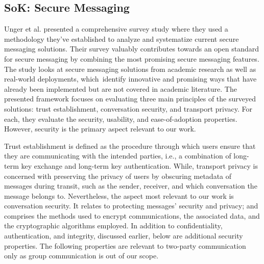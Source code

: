 \subsection{SoK: Secure Messaging}
Unger et al. \cite{unger2015sok} presented a comprehensive survey study where they used a methodology they've established to analyze and systematize current secure messaging solutions. Their survey valuably contributes towards an open standard for secure messaging by combining the most promising secure messaging features. The study looks at secure messaging solutions from academic research as well as real-world deployments, which identify innovative and promising ways that have already been implemented but are not covered in academic literature. The presented framework focuses on evaluating three main principles of the surveyed solutions: trust establishment, conversation security, and transport privacy.
For each, they evaluate the security, usability, and ease-of-adoption properties. However, security is the primary aspect relevant to our work.
\par
Trust establishment is defined as the procedure through which users ensure that they are communicating with the intended parties, i.e., a combination of long-term key exchange and long-term key authentication. While, transport privacy is concerned with preserving the privacy of users by obscuring metadata of messages during transit, such as the sender, receiver, and which conversation the message belongs to. Nevertheless, the aspect most relevant to our work is conversation security. It relates to protecting messages' security and privacy; and comprises the methods used to encrypt communications, the associated data, and the cryptographic algorithms employed. In addition to confidentiality, authentication, and integrity, discussed earlier, below are additional security properties. The following properties are relevant to two-party communication only as group communication is out of our scope.
